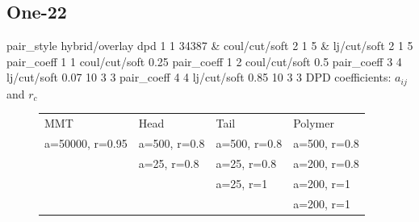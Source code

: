 \documentclass[a4paper]{article}
\begin{document}
\subsection*{One-22}
pair\_style hybrid/overlay dpd 1 1 34387 \& coul/cut/soft 2 1 5 \& 
lj/cut/soft 2 1 5\newline
pair\_coeff 1 1 coul/cut/soft 0.25
pair\_coeff 1 2 coul/cut/soft 0.5\newline
pair\_coeff 3 4 lj/cut/soft 0.07    10 3 3\newline
pair\_coeff 4 4 lj/cut/soft 0.85    10 3 3\newline
DPD coefficients: $a_{ij}$ and $r_c$
\begin{figure}[H]\begin{tabular}{llll}
MMT             & Head         & Tail         & Polymer      \\
a=50000, r=0.95 & a=500, r=0.8 & a=500, r=0.8 & a=500, r=0.8 \\
                & a=25,  r=0.8 & a=25,  r=0.8 & a=200, r=0.8 \\
                &              & a=25,  r=1   & a=200, r=1   \\
                &              &              & a=200, r=1   \\
\end{tabular}\end{figure}
\end{document}
